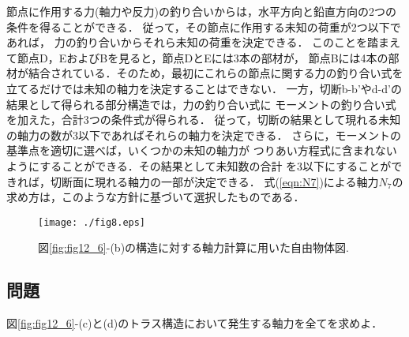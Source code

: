 ﻿\documentclass[10pt,a4j]{jbook}
\begin{document}
節点に作用する力(軸力や反力)の釣り合いからは，水平方向と鉛直方向の2つの条件を得ることができる．
従って，その節点に作用する未知の荷重が2つ以下であれば，
力の釣り合いからそれら未知の荷重を決定できる．
このことを踏まえて節点D，EおよびBを見ると，節点DとEには3本の部材が，
節点Bには4本の部材が結合されている．そのため，最初にこれらの節点に関する力の釣り合い式を
立てるだけでは未知の軸力を決定することはできない．
一方，切断b-b'やd-d'の結果として得られる部分構造では，力の釣り合い式に
モーメントの釣り合い式を加えた，合計3つの条件式が得られる．
従って，切断の結果として現れる未知の軸力の数が3以下であればそれらの軸力を決定できる．
さらに，モーメントの基準点を適切に選べば，いくつかの未知の軸力が
つりあい方程式に含まれないようにすることができる．その結果として未知数の合計
を3以下にすることができれば，切断面に現れる軸力の一部が決定できる．
式(\ref{eqn:N7})による軸力$N_7$の求め方は，このような方針に基づいて選択したものである．
\begin{figure}[h]
	\begin{center}
	\texttt{[image: ./fig8.eps]} 
	\end{center}
	\caption{
	図\ref{fig:fig12_6}-(b)の構造に対する軸力計算に用いた自由物体図.
	} 
	\label{fig:fig12_8}
\end{figure}
\subsection{問題}
図\ref{fig:fig12_6}-(c)と(d)のトラス構造において発生する軸力を全てを求めよ．
\end{document}
